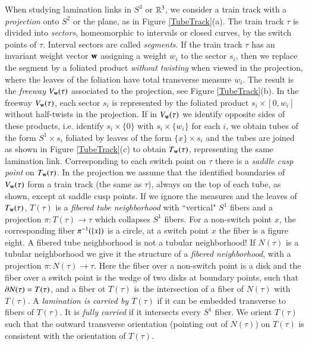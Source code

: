 \documentclass[12pt]{article}
\theoremstyle{remark}
\begin{document}
When studying lamination links in $S^3$ or $\mathbb R^3$, we consider a train track with a {\it projection} onto $S^2$ or the plane, as in Figure \ref{TubeTrack}(a).   The train track $\tau$ is divided into {\it sectors}, homeomorphic to intervals or closed curves, by the switch points of $\tau$.  Interval sectors are called {\it segments}. If the train track $\tau$ has an invariant weight vector ${\bf w}$ assigning a weight $w_i$ to the sector $s_i$, then we replace the segment by a foliated product {\it without twisting} when viewed in the projection, where the leaves of the foliation have total transverse measure $w_i$.   The result is the {\it freeway} $V_{\bf w}(\tau)$ associated to the projection, see Figure \ref{TubeTrack}(b).  In the freeway $V_{\bf w}(\tau)$, each sector $s_i$ is represented by the foliated product $s_i\times [0,w_i]$ without half-twists in the projection.  If in $V_{\bf w}(\tau)$ we identify opposite sides of these products, i.e. identify $s_i\times \{0\}$ with $s_i\times \{w_i\}$ for each $i$, we obtain tubes of the form $S^1\times s_i$ foliated by leaves of the form $\{x\}\times s_i$ and the tubes are joined as shown in Figure \ref{TubeTrack}(c) to obtain $T_{\bf w}(\tau)$, representing the same lamination link.  Corresponding to each switch point on $\tau$ there is a {\it saddle cusp point} on $T_{\bf w}(\tau)$.   In the projection we assume that the identified boundaries of $V_{\bf w}(\tau)$ form a train track (the same as $\tau$), always on the top of each tube, as shown, except at saddle cusp points.  If we ignore the measures and the leaves of $T_{\bf w}(\tau)$, $T(\tau)$ is a {\it fibered tube neighborhood} with ``vertical" $S^1$ fibers and a projection $\pi:T(\tau)\to \tau$ which collapses $S^1$ fibers.  For a non-switch point $x$, the corresponding fiber $\pi^{-1}(\{x\})$ is a circle, at a switch point $x$ the fiber is a figure eight.   A fibered tube neighborhood is not a tubular neighborhood!  If $N(\tau)$ is a tubular neighborhood we give it the structure of a {\it fibered neighborhood}, with a projection $\pi:N(\tau)\to \tau$.  Here the fiber over a non-switch point is a disk and the fiber over a switch point  is the wedge of two disks at boundary points, such that $\partial N(\tau)=T(\tau)$, and a fiber ot $T(\tau)$ is the intersection of a fiber of $N(\tau)$ with $T(\tau)$.    A {\it lamination is carried by $T(\tau)$} if it can be embedded transverse to fibers of $T(\tau)$.   It is {\it fully carried} if it intersects every $S^1$ fiber.  We orient $T(\tau)$ such that the outward transverse orientation (pointing out of $N(\tau)$) on $T(\tau)$ is consistent with the orientation of $T(\tau)$.  
\end{document}

